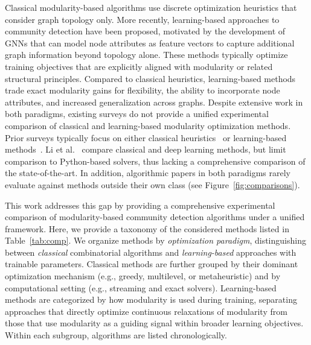 \documentclass[../paper.tex]{subfiles}
\begin{document}
Classical modularity-based algorithms use discrete optimization heuristics that consider graph topology only. More recently, learning-based approaches to community detection have been proposed, motivated by the development of GNNs that can model node attributes as feature vectors to capture additional graph information beyond topology alone. 
These methods typically optimize training objectives that are explicitly aligned with modularity or related structural principles.
Compared to classical heuristics, learning-based methods trade exact modularity gains for flexibility, the ability to incorporate node attributes, and increased generalization across graphs.
Despite extensive work in both paradigms, existing surveys do not provide a unified experimental comparison of classical and learning-based modularity optimization methods. Prior surveys typically focus on either classical heuristics~\cite{survey2023} or learning-based methods~\cite{Liu2020,Jin2023,liang2024,Messias2025}.
Li et al.~\cite{Li2024} compare classical and deep learning methods, but limit comparison to Python-based solvers, thus lacking a comprehensive comparison of the state-of-the-art. In addition, algorithmic papers in both paradigms rarely evaluate against methods outside their own class (see Figure~\ref{fig:comparisons}).




This work addresses this gap by providing a comprehensive experimental comparison of modularity-based community detection algorithms under a unified framework. Here, we provide a taxonomy of the considered methods listed in Table~\ref{tab:comp}. We organize methods by \emph{optimization paradigm}, distinguishing between \emph{classical} combinatorial algorithms and \emph{learning-based} approaches with trainable parameters. Classical methods are further grouped by their dominant optimization mechanism (e.g., greedy, multilevel, or metaheuristic) and by computational setting (e.g., streaming and exact solvers). Learning-based methods are categorized by how modularity is used during training, separating approaches that directly optimize continuous relaxations of modularity from those that use modularity as a guiding signal within broader learning objectives. 
Within each subgroup, algorithms are listed chronologically.
\end{document}
